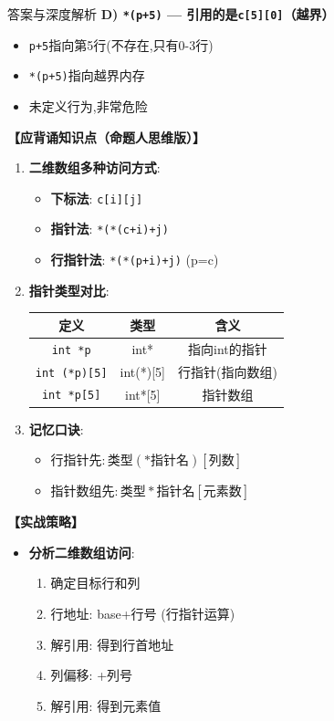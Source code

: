 \documentclass[a4paper,12pt]{article}
\begin{document}
\begin{bluebox}{答案与深度解析}
	\textbf{D) \texttt{*(p+5)} — 引用的是\texttt{c[5][0]}（越界）}
	\begin{itemize}[leftmargin=*, nosep]
		\item \texttt{p+5}指向第5行(不存在,只有0-3行)
		\item \texttt{*(p+5)}指向越界内存
		\item 未定义行为,非常危险
	\end{itemize}

	\textbf{【应背诵知识点（命题人思维版）】}
	\begin{enumerate}[leftmargin=*, nosep]
		\item \textbf{二维数组多种访问方式}:
		      \begin{itemize}
			      \item \textbf{下标法}: \texttt{c[i][j]}
			      \item \textbf{指针法}: \texttt{*(*(c+i)+j)}
			      \item \textbf{行指针法}: \texttt{*(*(p+i)+j)} (p=c)
		      \end{itemize}

		\item \textbf{指针类型对比}:
		      \begin{tabular}{|c|c|c|}
			      \hline
			      \textbf{定义}          & \textbf{类型} & \textbf{含义} \\
			      \hline
			      \texttt{int *p}      & int*        & 指向int的指针    \\
			      \hline
			      \texttt{int (*p)[5]} & int(*)[5]   & 行指针(指向数组)   \\
			      \hline
			      \texttt{int *p[5]}   & int*[5]     & 指针数组        \\
			      \hline
		      \end{tabular}

		\item \textbf{记忆口诀}:
		      \begin{itemize}
			      \item 行指针先$:类型 (*指针名)[列数]$
			      \item 指针数组先$:类型 *指针名[元素数]$
		      \end{itemize}
	\end{enumerate}

	\textbf{【实战策略】}
	\begin{itemize}[leftmargin=*, nosep]
		\item \textbf{分析二维数组访问}:
		      \begin{enumerate}
			      \item 确定目标行和列
			      \item 行地址: base+行号 (行指针运算)
			      \item 解引用: 得到行首地址
			      \item 列偏移: +列号
			      \item 解引用: 得到元素值
		      \end{enumerate}


\end{itemize}
\end{bluebox}
\end{document}
